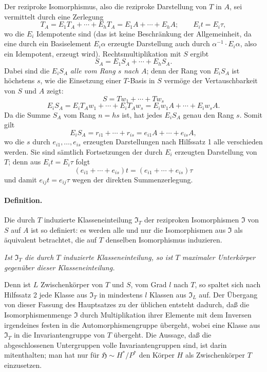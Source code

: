 Der reziproke Isomorphismus, also die reziproke Darstellung von \(T\) in \(A\), sei vermittelt durch eine Zerlegung
\[
        T_A=E_1T_A+\cdots+E_hT_A
            =E_1A+\cdots+E_hA;\qquad E_it=E_i\tau,
\]
wo die \(E_i\) Idempotente sind (das ist keine Beschränkung der Allgemeinheit, da eine durch ein Basiselement \(E_i\alpha\) erzeugte Darstellung auch durch \(\alpha^{-1}\cdot E_i\alpha\), also ein Idempotent, erzeugt wird). Rechtsmultiplikation mit \(S\) ergibt
\[
        S_A=E_1S_A+\cdots+E_hS_A .
\]
Dabei sind die \(E_iS_A\) \emph{alle vom Rang \(s\) nach \(A\)}; denn der Rang von \(E_iS_A\) ist höchstens \(s\), wie die Einsetzung einer \(T\)-Basis in \(S\) vermöge der Vertauschbarkeit von \(S\) und \(A\) zeigt:
\[
        S=Tw_1+\cdots+Tw_s
\]
\[
        E_iS_A=E_iT_Aw_1+\cdots+E_iT_Aw_s
              =E_iw_1A+\cdots+E_iw_sA .
\]
Da die Summe \(S_A\) vom Rang \(n=hs\) ist, hat jedes \(E_iS_A\) genau den Rang \(s\). Somit gilt
\[
        E_iS_A=r_{i1}+\cdots+r_{is}
              =e_{i1}A+\cdots+e_{is}A,
\]
wo die \(s\) durch \(e_{i1},\ldots,e_{is}\) erzeugten Darstellungen nach Hilfssatz 1 alle verschieden werden. Sie sind sämtlich Fortsetzungen der durch \(E_i\) erzeugten Darstellung von \(T\); denn aus \(E_it=E_i\tau\) folgt
\[
        (e_{i1}+\cdots+e_{is})t=(e_{i1}+\cdots+e_{is})\tau
\]
und damit \(e_{ij}t=e_{ij}\tau\) wegen der direkten Summenzerlegung.

\paragraph{Definition.}
Die durch \(T\) induzierte Klasseneinteilung \(\mathfrak I_T\) der reziproken Isomorphismen \(\mathfrak I\) von \(S\) auf \(A\) ist so definiert: es werden alle und nur die Isomorphismen aus \(\mathfrak I\) als äquivalent betrachtet, die auf \(T\) denselben Isomorphismus induzieren.

\noindent\textbf{} \emph{Ist \(\mathfrak I_T\) die durch \(T\) induzierte Klasseneinteilung, so ist \(T\) maximaler Unterkörper gegenüber dieser Klasseneinteilung.}

Denn ist \(L\) Zwischenkörper von \(T\) und \(S\), vom Grad \(l\) nach \(T\), so spaltet sich nach Hilfssatz 2 jede Klasse aus \(\mathfrak I_T\) in mindestens \(l\) Klassen aus \(\mathfrak I_L\) auf. Der Übergang von dieser Fassung des Hauptsatzes zu der üblichen entsteht dadurch, daß die Isomorphismenmenge \(\mathfrak I\) durch Multiplikation ihrer Elemente mit dem Inversen irgendeines festen in die Automorphismengruppe übergeht, wobei eine Klasse aus \(\mathfrak I_T\) in die Invariantengruppe von \(T\) übergeht. Die Aussage, daß die abgeschlossenen Untergruppen volle Invariantengruppen sind, ist darin mitenthalten; man hat nur für \(\mathfrak H\sim H^*/P^*\) den Körper \(H\) als Zwischenkörper \(T\) einzusetzen.

